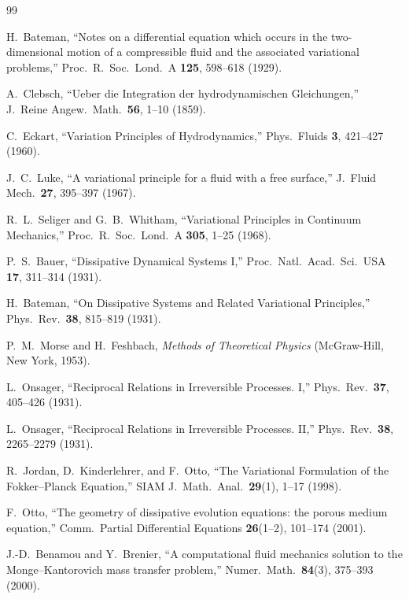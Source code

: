 \documentclass[11pt]{article}
\begin{document}
\begin{thebibliography}{99}

 H.~Bateman, ``Notes on a differential equation which occurs in the two-dimensional motion of a compressible fluid and the associated variational problems,'' Proc.\ R.\ Soc.\ Lond.\ A \textbf{125}, 598--618 (1929).

 A.~Clebsch, ``Ueber die Integration der hydrodynamischen Gleichungen,'' J.\ Reine Angew.\ Math.\ \textbf{56}, 1--10 (1859).

 C.~Eckart, ``Variation Principles of Hydrodynamics,'' Phys.\ Fluids \textbf{3}, 421--427 (1960).

 J.~C.~Luke, ``A variational principle for a fluid with a free surface,'' J.\ Fluid Mech.\ \textbf{27}, 395--397 (1967).

 R.~L.~Seliger and G.~B.~Whitham, ``Variational Principles in Continuum Mechanics,'' Proc.\ R.\ Soc.\ Lond.\ A \textbf{305}, 1--25 (1968).

 P.~S.~Bauer, ``Dissipative Dynamical Systems I,'' Proc.\ Natl.\ Acad.\ Sci.\ USA \textbf{17}, 311--314 (1931).

 H.~Bateman, ``On Dissipative Systems and Related Variational Principles,'' Phys.\ Rev.\ \textbf{38}, 815--819 (1931).

 P.~M.~Morse and H.~Feshbach, \emph{Methods of Theoretical Physics} (McGraw-Hill, New York, 1953).

 L.~Onsager, ``Reciprocal Relations in Irreversible Processes. I,'' Phys.\ Rev.\ \textbf{37}, 405--426 (1931).

 L.~Onsager, ``Reciprocal Relations in Irreversible Processes. II,'' Phys.\ Rev.\ \textbf{38}, 2265--2279 (1931).

 R.~Jordan, D.~Kinderlehrer, and F.~Otto, ``The Variational Formulation of the Fokker--Planck Equation,'' SIAM J.\ Math.\ Anal.\ \textbf{29}(1), 1--17 (1998).

 F.~Otto, ``The geometry of dissipative evolution equations: the porous medium equation,'' Comm.\ Partial Differential Equations \textbf{26}(1--2), 101--174 (2001).

 J.-D.~Benamou and Y.~Brenier, ``A computational fluid mechanics solution to the Monge--Kantorovich mass transfer problem,'' Numer.\ Math.\ \textbf{84}(3), 375--393 (2000).


\end{thebibliography}
\end{document}
